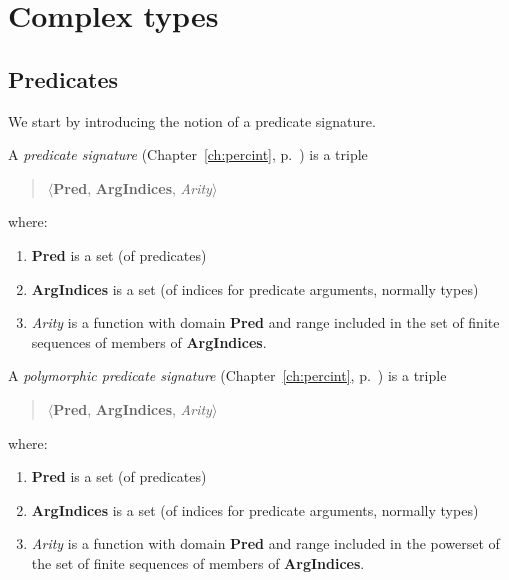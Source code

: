  

\section{Complex types}

\subsection{Predicates}
\label{app:predicates}
We start by introducing the notion of a predicate signature.

A \textit{predicate signature} (Chapter~\ref{ch:percint}, p.~\pageref{ex:pred-sig})
is a triple
\begin{quote}
$\langle$\textbf{Pred}, \textbf{ArgIndices}, \textit{Arity}$\rangle$
\end{quote}
where:
\begin{enumerate} 
 
\item \textbf{Pred} is a set (of predicates)

\item \textbf{ArgIndices} is a set (of indices for predicate
  arguments, normally types)
 
\item \textit{Arity} is a function with domain \textbf{Pred} and range
  included in the set of finite sequences of members of \textbf{ArgIndices}. 
 
\end{enumerate}

\medskip

A \textit{polymorphic predicate signature} (Chapter~\ref{ch:percint}, p.~\pageref{ex:poly-pred-sig})
is a triple 
\begin{quote}
$\langle$\textbf{Pred}, \textbf{ArgIndices}, \textit{Arity}$\rangle$
\end{quote}
where:
\begin{enumerate} 
 
\item \textbf{Pred} is a set (of predicates)

\item \textbf{ArgIndices} is a set (of indices for predicate
  arguments, normally types)
 
\item \textit{Arity} is a function with domain \textbf{Pred} and range
  included in the powerset of the set of finite sequences of members
  of \textbf{ArgIndices}. 
 
\end{enumerate}
 

